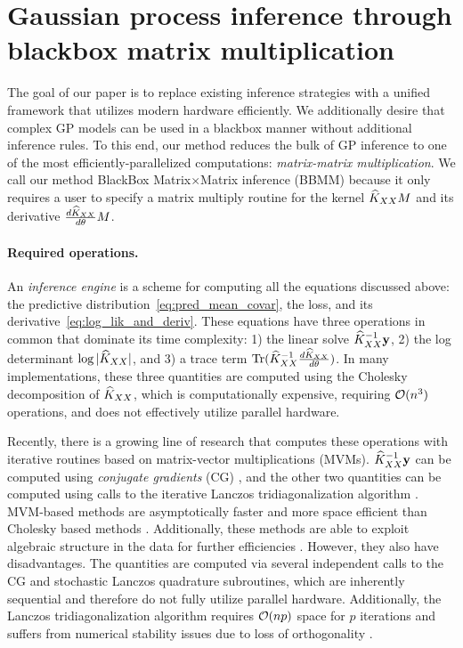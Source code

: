 \section{Gaussian process inference through blackbox matrix multiplication}

\label{sec:method}
The goal of our paper is to replace existing inference strategies with a unified framework that utilizes modern hardware efficiently.
We additionally desire that complex GP models can be used in a blackbox manner without additional inference rules. To this end,
our method reduces the bulk of GP inference to one of the most efficiently-parallelized computations: \emph{matrix-matrix multiplication}.
We call our method BlackBox Matrix$\times$Matrix inference (BBMM) because it only requires a user to specify a matrix multiply routine for the kernel $\widehat{K}_{XX} M$ and its derivative $\frac{d\widehat{K}_{XX}}{d\theta}M$.

\paragraph{Required operations.}
An \emph{inference engine} is a scheme for computing all the equations discussed above: the predictive distribution~\eqref{eq:pred_mean_covar}, the loss, and its derivative~\eqref{eq:log_lik_and_deriv}.
These equations have three operations in common that dominate its time complexity:
1) the linear solve $\widehat{K}_{XX}^{-1}\mathbf{y}$,
2) the log determinant $\log \vert \widehat{K}_{XX} \vert$,
and 3) a trace term $\tr{\trainK^{-1}\frac{d\trainK}{d\theta}}$.
In many implementations, these three quantities are computed using the Cholesky decomposition of $\widehat{K}_{XX}$,
which is computationally expensive, requiring $\bigo{n^3}$ operations, and does not effectively utilize parallel hardware.

Recently, there is a growing line of research that computes these operations with iterative routines based on matrix-vector multiplications (MVMs).
$\widehat{K}_{XX}^{-1}\mathbf{y}$ can be computed using \emph{conjugate gradients} (CG) \cite{cunningham2008fast,cutajar2016preconditioning,saatcci2012scalable,wilson2015kernel},
and the other two quantities can be computed using calls to the iterative Lanczos tridiagonalization algorithm \cite{ubaru2017fast,dong2017scalable}.
MVM-based methods are asymptotically faster and more space efficient than Cholesky based methods \cite{wilson2015kernel,dong2017scalable}.
Additionally, these methods are able to exploit algebraic structure in the data for further efficiencies \cite{cunningham2008fast,saatcci2012scalable,wilson2015kernel}.
However, they also have disadvantages.
The quantities are computed via several independent calls to the CG and stochastic Lanczos quadrature subroutines, which are inherently sequential and therefore do not fully utilize parallel hardware. Additionally, the Lanczos tridiagonalization algorithm requires $\bigo{np}$ space for $p$ iterations and suffers from numerical stability issues due to loss of orthogonality \cite{golub2012matrix}.

